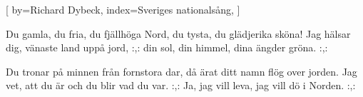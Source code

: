 

[
by={Richard Dybeck},
index={Sveriges nationalsång},
]

\beginverse*
 Du gamla, du fria, du fjällhöga Nord,
du tysta, du glädjerika sköna!
Jag hälsar dig, vänaste land uppå jord,
:,: din sol, din himmel, dina ängder gröna. :,:
\endverse

\beginverse*
Du tronar på minnen från fornstora dar, 
då ärat ditt namn flög over jorden.
Jag vet, att du är och du blir vad du var.
:,: Ja, jag vill leva, jag vill dö i Norden. :,:
\endverse
\endsong


